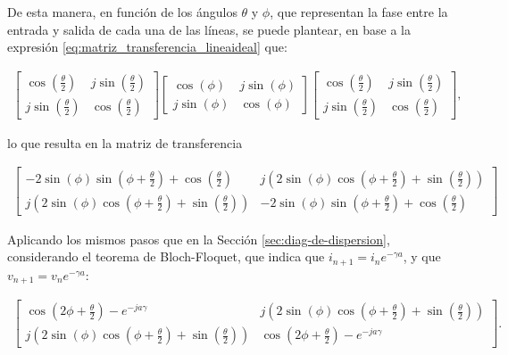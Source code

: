 De esta manera, en función de los ángulos $\theta$ y $\phi$, que representan la fase entre la entrada y salida de cada una de las líneas, se puede plantear, en base a la expresión \ref{eq:matriz_transferencia_lineaideal} que:

\begin{align}
	\left[
		\begin{matrix}
			\cos{\left (\frac{\theta}{2} \right )} & j \sin{\left (\frac{\theta}{2} \right )}\\
			j \sin{\left (\frac{\theta}{2} \right )} & \cos{\left (\frac{\theta}{2} \right )}
		\end{matrix}
	\right]
	\left[
		\begin{matrix}
			\cos{\left (\phi \right )} & j \sin{\left (\phi \right )}\\
			j\sin{\left (\phi \right )} & \cos{\left (\phi \right )}
		\end{matrix}
	\right]
	\left[
		\begin{matrix}
			\cos{\left (\frac{\theta}{2} \right )} & j \sin{\left (\frac{\theta}{2} \right )}\\
			j \sin{\left (\frac{\theta}{2} \right )} & \cos{\left (\frac{\theta}{2} \right )}
		\end{matrix}
	\right],
\end{align}

lo que resulta en la matriz de transferencia

\begin{align}
	\left[
		\begin{matrix}
			- 2 \sin{\left (\phi \right )} \sin{\left (\phi + \frac{\theta}{2} \right )} + \cos{\left (\frac{\theta}{2} \right )} & j \left(2 \sin{\left (\phi \right )} \cos{\left (\phi + \frac{\theta}{2} \right )} + \sin{\left (\frac{\theta}{2} \right )}\right)\\
			j \left(2 \sin{\left (\phi \right )} \cos{\left (\phi + \frac{\theta}{2} \right )} + \sin{\left (\frac{\theta}{2} \right )}\right) & - 2\sin{\left (\phi \right )} \sin{\left (\phi + \frac{\theta}{2} \right )} + \cos{\left (\frac{\theta}{2} \right )}
		\end{matrix}
	\right]
\end{align}

Aplicando los mismos pasos que en la Sección \ref{sec:diag-de-dispersion}, considerando el teorema de Bloch-Floquet, que indica que $i_{n+1} = i_{n} e^{-\gamma a}$, y que $v_{n+1} = v_{n} e^{-\gamma a}$:

\begin{align}
	\left[
		\begin{matrix}
			\cos{\left (2 \phi + \frac{\theta}{2} \right )} - e^{-j a \gamma} & j \left(2 \sin{\left (\phi \right )} \cos{\left (\phi + \frac{\theta}{2} \right )} + \sin{\left (\frac{\theta}{2} \right )}\right)\\
			j \left(2 \sin{\left (\phi \right )} \cos{\left (\phi + \frac{\theta}{2} \right )} + \sin{\left (\frac{\theta}{2} \right )}\right) & \cos{\left (2 \phi + \frac{\theta}{2} \right )} - e^{- j a \gamma}
		\end{matrix}
	\right].
\end{align}


